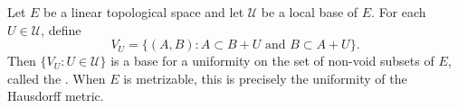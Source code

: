 Let $E$ be a linear topological space and let $\mathcal{U}$ be a local base of $E$. For each $U \in \mathcal{U}$, define
$$V_U = \{(A,B): A \subset B + U \text{ and } B \subset A + U\}.$$
Then $\{V_U: U \in \mathcal{U}\}$ is a base for a uniformity on the set of non-void subsets of $E$, called the . When $E$ is metrizable, this is precisely the uniformity of the Hausdorff metric.
